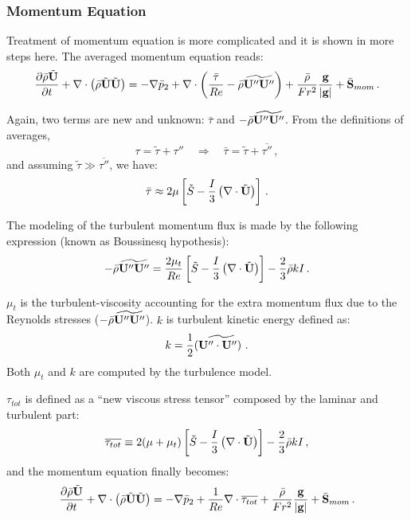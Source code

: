 \subsubsection{Momentum Equation}
Treatment of momentum equation is more complicated and it is shown in more
steps here. The averaged momentum equation reads:
\begin{equation}
 \frac{\partial \bar{\rho} \tilde{\mathbf{U}} }{\partial t} + \nabla \cdot \left(
\bar{\rho} \tilde{\mathbf{U}} \tilde{\mathbf{U}} \right) = -\nabla \bar{p}_2 +  \nabla
\cdot \left(  \frac{\bar{\mathbf{\tau}}}{Re} - \bar{\rho}\widetilde{\mathbf{U}''
\mathbf{U}''} \right) +\frac{\bar{\rho}}{Fr^2}
\frac{\mathbf{g}}{|\mathbf{g}|}+\bar{\mathbf{S}}_{mom}  \, .
\end{equation}

Again, two terms are new and unknown: $\bar{\tau}$ and $-
\bar{\rho}\widetilde{\mathbf{U}'' \mathbf{U}''}$. From the definitions of averages, 
\begin{equation}
 \tau = \tilde{\tau}+\tau'' \quad \Rightarrow \quad \bar{\tau} =
\tilde{\tau}+\overline{\tau''} \, ,
\end{equation}
and assuming $\tilde{\tau} \gg \overline{\tau''}$, we have:
\begin{equation}
 \bar{\tau} \approx  2\mu\left[ \tilde{S}-\frac{I}{3}\left(\nabla \cdot
\tilde{\mathbf{U}} \right)  \right] \, .
\end{equation}

The modeling of the turbulent momentum flux is made by the following
expression (known as Boussinesq hypothesis):
\begin{equation}\label{eq: boussinesq}
 - \bar{\rho}\widetilde{\bv{U}'' \bv{U}''} =  \frac{2 \mu_t}{Re} \left[
\tilde{S}-\frac{I}{3} \left( \nabla \cdot \tilde{\bv{U}} \right)  \right] -
\frac{2}{3}\bar{\rho}kI \, .
\end{equation}

$\mu_t$ is the turbulent-viscosity accounting for the extra momentum flux due to the Reynolds stresses ($-
\bar{\rho}\widetilde{\mathbf{U}'' \mathbf{U}''}$). $k$ is turbulent kinetic energy defined as:
\begin{equation}
  k = \frac{1}{2} \widetilde{\left(\mathbf{U}'' \cdot \mathbf{U}'' \right) \, .}
\end{equation}
Both $\mu_t$ and $k$ are computed by the turbulence model.

$\tau_{tot}$ is defined as a ``new viscous stress tensor'' composed by the
laminar and turbulent part:
\begin{equation}
 \overline{\tau_{tot}} \equiv 2 (\mu + \mu_t) \left[
\tilde{S}-\frac{I}{3}\left(\nabla \cdot \tilde{\mathbf{U}} \right)  \right]
-\frac{2}{3}\bar{\rho}k I \, ,
\end{equation}
and the momentum equation finally becomes:
\begin{equation}\label{av: momentum}
 \frac{\partial \bar{\rho} \tilde{\bv{U}} }{\partial t} + \nabla \cdot \left(
\bar{\rho} \tilde{\bv{U}} \tilde{\bv{U}} \right) = -\nabla \bar{p}_2 +  
\frac{1}{Re}  \nabla \cdot\overline{\bv{\tau}_{tot}} +\frac{\bar{\rho}}{Fr^2}
\frac{\bv{g}}{|\bv{g}|}+\bar{\bv{S}}_{mom}  \, .
\end{equation}

